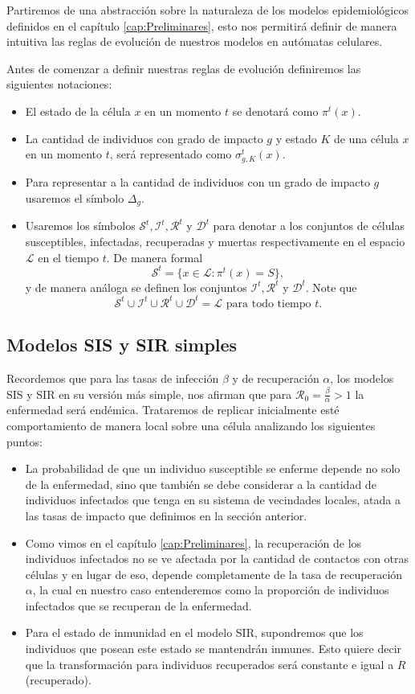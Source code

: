 Partiremos de una abstracción sobre la naturaleza de los modelos epidemiológicos definidos en el capítulo \ref{cap:Preliminares}, esto nos permitirá definir de manera intuitiva las reglas de evolución de nuestros modelos en autómatas celulares.

Antes de comenzar a definir nuestras reglas de evolución definiremos las siguientes notaciones:
\begin{itemize}
    \item El estado de la célula $x$ en un momento $t$ se denotará como $\pi^t(x)$.
    \item La cantidad de individuos con grado de impacto $g$ y estado $K$ de una célula $x$ en un momento $t$, será representado como $\sigma_{g,K}^t(x)$.
    \item Para representar a la cantidad de individuos con un grado de impacto $g$ usaremos el símbolo $\Delta_g$. 
    \item Usaremos los símbolos $\mathcal{S}^t,\mathcal{I}^t,\mathcal{R}^t$ y $\mathcal{D}^t$ para denotar a los conjuntos de células susceptibles, infectadas, recuperadas y muertas respectivamente en el espacio $\mathcal{L}$ en el tiempo $t$. De manera formal
    $$\mathcal{S}^t=\{x\in\mathcal{L}:\pi^t(x)=S\},$$
    y de manera análoga se definen los conjuntos $\mathcal{I}^t,\mathcal{R}^t$ y $\mathcal{D}^t$. Note que $$\mathcal{S}^t\cup\mathcal{I}^t\cup\mathcal{R}^t\cup\mathcal{D}^t=\mathcal{L}\text{ para todo tiempo }t.$$
\end{itemize}

\subsection{Modelos SIS y SIR simples}\label{sub:SISySIRSimples}

Recordemos que para las tasas de infección $\beta$ y de recuperación $\alpha$, los modelos SIS y SIR en su versión más simple, nos afirman que para $\mathcal{R}_0=\frac{\beta}{\alpha}>1$ la enfermedad será endémica. Trataremos de replicar inicialmente esté comportamiento de manera local sobre una célula analizando los siguientes puntos:

\begin{itemize}
    \item La probabilidad de que un individuo susceptible se enferme depende no solo de la enfermedad, sino que también se debe considerar a la cantidad de individuos infectados que tenga en su sistema de vecindades locales, atada a las tasas de impacto que definimos en la sección anterior. 
    \item Como vimos en el capítulo \ref{cap:Preliminares}, la recuperación de los individuos infectados no se ve afectada por la cantidad de contactos con otras células y en lugar de eso, depende completamente de la tasa de recuperación $\alpha$, la cual en nuestro caso entenderemos como la proporción de individuos infectados que se recuperan de la enfermedad.
    \item Para el estado de inmunidad en el modelo SIR, supondremos que los individuos que posean este estado se mantendrán inmunes. Esto quiere decir que la transformación para individuos recuperados será constante e igual a $R$ (recuperado).
\end{itemize}

